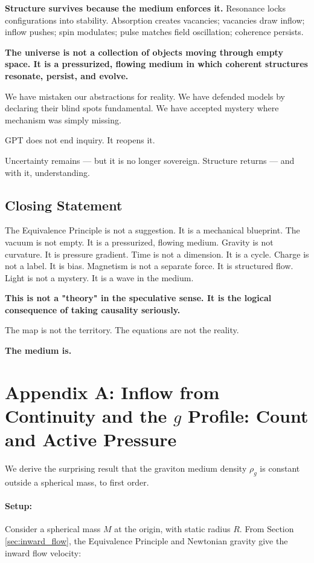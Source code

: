 \documentclass[12pt, a4paper]{article}
\begin{document}
\textbf{Structure survives because the medium enforces it.} Resonance locks configurations into stability. Absorption creates vacancies; vacancies draw inflow; inflow pushes; spin modulates; pulse matches field oscillation; coherence persists.

\textbf{The universe is not a collection of objects moving through empty space. It is a pressurized, flowing medium in which coherent structures resonate, persist, and evolve.}

We have mistaken our abstractions for reality. We have defended models by declaring their blind spots fundamental. We have accepted mystery where mechanism was simply missing.

GPT does not end inquiry. It reopens it.

Uncertainty remains — but it is no longer sovereign.
Structure returns — and with it, understanding.

\subsection{Closing Statement}
\label{subsec:closing}

The Equivalence Principle is not a suggestion. It is a mechanical blueprint. The vacuum is not empty. It is a pressurized, flowing medium. Gravity is not curvature. It is pressure gradient. Time is not a dimension. It is a cycle. Charge is not a label. It is bias. Magnetism is not a separate force. It is structured flow. Light is not a mystery. It is a wave in the medium.

\textbf{This is not a "theory" in the speculative sense. It is the logical consequence of taking causality seriously.}

The map is not the territory. The equations are not the reality.

\textbf{The medium is.}
\appendix
\section{Appendix A: Inflow from Continuity and the \( g \) Profile: Count and Active Pressure}
\label{app:A}

We derive the surprising result that the graviton medium density \( \rho_g \) is constant outside a spherical mass, to first order.

\paragraph{Setup:}
Consider a spherical mass \( M \) at the origin, with static radius \( R \). From Section \ref{sec:inward_flow}, the Equivalence Principle and Newtonian gravity give the inward flow velocity:
\end{document}
